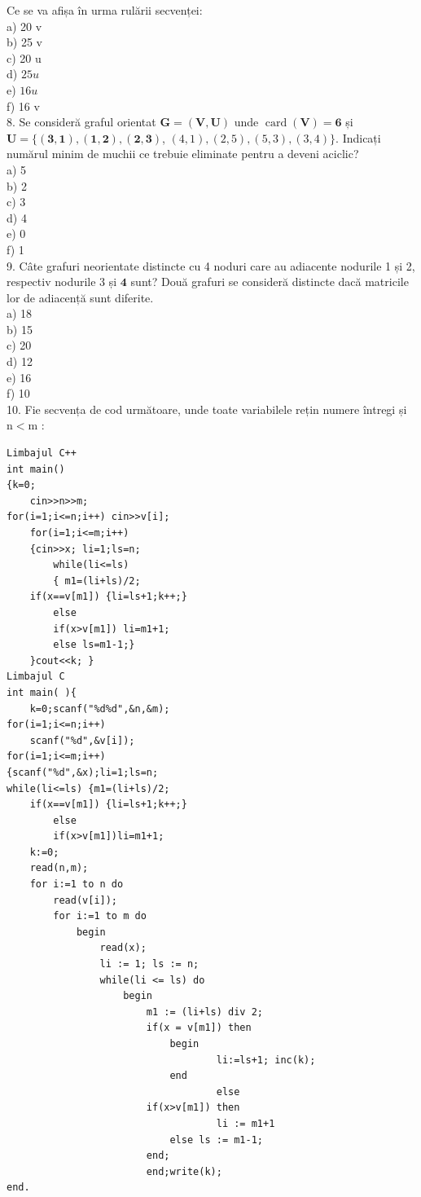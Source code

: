 \documentclass[10pt]{article}
\begin{document}
Ce se va afișa în urma rulării secvenței:\\
a) 20 v\\
b) 25 v\\
c) 20 u\\
d) $25 u$\\
e) $16 u$\\
f) 16 v\\
8. Se consideră graful orientat $\mathbf{G}=(\mathbf{V}, \mathbf{U})$ unde $\operatorname{card}(\mathbf{V})=\mathbf{6}$ și $\mathbf{U}=\{(\mathbf{3}, \mathbf{1}),(\mathbf{1}, \mathbf{2}),(\mathbf{2}, \mathbf{3})$, $(4,1),(2,5),(5,3),(3,4)\}$. Indicați numărul minim de muchii ce trebuie eliminate pentru a deveni aciclic?\\
a) 5\\
b) 2\\
c) 3\\
d) 4\\
e) 0\\
f) 1\\
9. Câte grafuri neorientate distincte cu 4 noduri care au adiacente nodurile 1 și 2, respectiv nodurile 3 și $\mathbf{4}$ sunt? Două grafuri se consideră distincte dacă matricile lor de adiacență sunt diferite.\\
a) 18\\
b) 15\\
c) 20\\
d) 12\\
e) 16\\
f) 10\\
10. Fie secvența de cod următoare, unde toate variabilele rețin numere întregi și $\mathrm{n}<\mathrm{m}$ :

\begin{verbatim}
Limbajul C++
int main()
{k=0;
    cin>>n>>m;
for(i=1;i<=n;i++) cin>>v[i];
    for(i=1;i<=m;i++)
    {cin>>x; li=1;ls=n;
        while(li<=ls)
        { m1=(li+ls)/2;
    if(x==v[m1]) {li=ls+1;k++;}
        else
        if(x>v[m1]) li=m1+1;
        else ls=m1-1;}
    }cout<<k; }
Limbajul C
int main( ){
    k=0;scanf("%d%d",&n,&m);
for(i=1;i<=n;i++)
    scanf("%d",&v[i]);
for(i=1;i<=m;i++)
{scanf("%d",&x);li=1;ls=n;
while(li<=ls) {m1=(li+ls)/2;
    if(x==v[m1]) {li=ls+1;k++;}
        else
        if(x>v[m1])li=m1+1;
    k:=0;
    read(n,m);
    for i:=1 to n do
        read(v[i]);
        for i:=1 to m do
            begin
                read(x);
                li := 1; ls := n;
                while(li <= ls) do
                    begin
                        m1 := (li+ls) div 2;
                        if(x = v[m1]) then
                            begin
                                    li:=ls+1; inc(k);
                            end
                                    else
                        if(x>v[m1]) then
                                    li := m1+1
                            else ls := m1-1;
                        end;
                        end;write(k);
end.
\end{verbatim}
\end{document}
